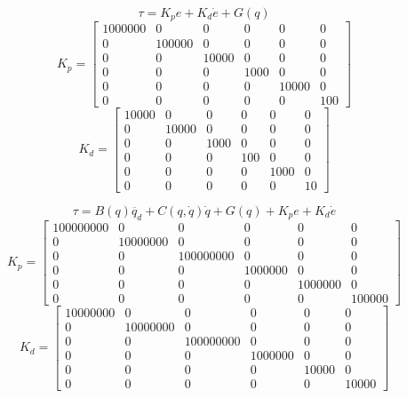 \documentclass[a4paper]{article}
\begin{document}
\begin{equation}
\tau = K_p e + K_d \dot{e} + G(q)
\end{equation}
\begin{equation}
K_p = 
\begin{bmatrix}
1000000 & 0 & 0	& 0 & 0 & 0 \\
0 & 100000 & 0 & 0 & 0 & 0 \\
0 & 0 & 10000 & 0 & 0 & 0 \\
0 & 0 & 0 & 1000 & 0 & 0 \\
0 & 0 & 0 & 0 & 10000 & 0 \\
0 & 0 & 0 & 0 & 0 & 100
\end{bmatrix}
\end{equation}
\begin{equation}
K_d = 
\begin{bmatrix}
10000 & 0 & 0	& 0 & 0 & 0 \\
0 & 10000 & 0 & 0 & 0 & 0 \\
0 & 0 & 1000 & 0 & 0 & 0 \\
0 & 0 & 0 & 100 & 0 & 0 \\
0 & 0 & 0 & 0 & 1000 & 0 \\
0 & 0 & 0 & 0 & 0 & 10
\end{bmatrix}
\end{equation}

\begin{equation}
\tau = B(q)\ddot{q_d} + C(q,\dot{q})\dot{q} + G(q)+ K_p e + K_d \dot{e}
\end{equation}
\begin{equation}
K_p = 
\begin{bmatrix}
100000000 & 0 & 0	& 0 & 0 & 0 \\
0 & 10000000 & 0 & 0 & 0 & 0 \\
0 & 0 & 100000000 & 0 & 0 & 0 \\
0 & 0 & 0 & 1000000 & 0 & 0 \\
0 & 0 & 0 & 0 & 1000000 & 0 \\
0 & 0 & 0 & 0 & 0 & 100000
\end{bmatrix}
\end{equation}
\begin{equation}
K_d = 
\begin{bmatrix}
10000000 & 0 & 0	& 0 & 0 & 0 \\
0 & 10000000 & 0 & 0 & 0 & 0 \\
0 & 0 & 100000000 & 0 & 0 & 0 \\
0 & 0 & 0 & 1000000 & 0 & 0 \\
0 & 0 & 0 & 0 & 10000 & 0 \\
0 & 0 & 0 & 0 & 0 & 10000
\end{bmatrix}
\end{equation}
\end{document}
